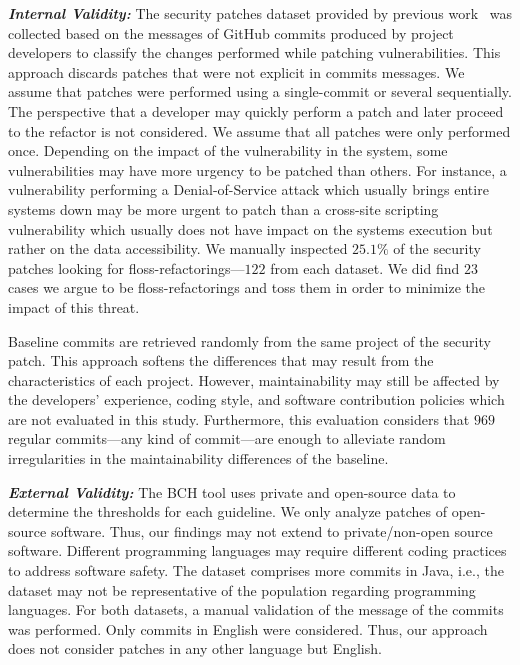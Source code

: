 \documentclass[smallextended]{svjour3}       %
\begin{document}
\textit{\textbf{Internal Validity:}} The security patches dataset provided by previous
work~\cite{Reis:2017:IJSSE} was collected based on the messages of GitHub
commits produced by project developers to classify the changes performed while 
patching vulnerabilities. This approach discards patches that were
not explicit in commits messages. We assume that patches were performed 
using a single-commit or several sequentially. The 
perspective that a 
developer may quickly perform a patch and later 
proceed to the refactor is not considered. We assume 
that all patches were only performed once. Depending 
on the impact of the vulnerability in the system, some 
vulnerabilities may have more urgency to be patched than 
others. For instance, a vulnerability performing a Denial-of-Service attack
which usually brings entire systems down may be more urgent to patch than a 
cross-site scripting vulnerability which usually does not have impact
on the systems execution but rather on the data accessibility.
We manually inspected $25.1\%$ of the security patches looking 
for floss-refactorings---$122$ from each dataset. We did 
find $23$ cases we argue to be floss-refactorings and toss them
in order to minimize the impact of this threat.

Baseline commits are retrieved randomly from 
the same project of the security patch.
This approach softens the differences
that may result from the characteristics of each project. However,
maintainability may still be affected by the developers' experience, coding
style, and software contribution policies which are not evaluated in this study.
Furthermore, this evaluation considers that $969$ regular commits---any kind
of commit---are enough to
alleviate random irregularities in the maintainability differences of the
baseline. 
%

\textit{\textbf{External Validity:}} The BCH tool uses private and open-source data to 
determine the thresholds for each guideline. We only analyze patches of open-source software.
Thus, our findings may not extend to private/non-open source software. Different programming 
languages may require different coding practices to address software safety. The 
dataset comprises more commits in Java, i.e., the dataset may not be representative 
of the population regarding programming languages. For both datasets, a manual validation 
of the message of the commits was performed. Only commits in English were considered. Thus, our approach does not consider 
patches in any other language but English.
\end{document}
